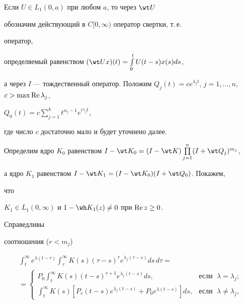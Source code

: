  


\begin{pf} 


Если $U\in L_1(0,a)$ при любом $a$, то через $\wt U$ 


обозначим действующий в $C[0,\infty)$ оператор свертки, т.\,е. 


оператор, 


определяемый равенством $(\wt U x)(t)=\int\limits^t_0 U(t-s)x(s)ds$, 


а через $I$ --- тождественный оператор. Положим $Q_j(t)=c e^{\lambda_j 


t}$, $j=1,\dotsc,n$, $c>\max\re\lambda_j$, 


$Q_0(t)=c\sum\limits^k_{j=1}t^{\alpha_j-1}e^{i\gamma_j t}$, 


где число $c$ достаточно мало и будет уточнено далее. 


 


Определим ядро $K_0$ равенством $I-\wt K_0=(I-\wt 


K)\prod\limits^n_{j=1}(I+\wt Q_j)^{m_j}$, 


а ядро $K_1$ равенством $I-\wt K_1=(I-\wt K_0)(I+\wt Q_0)$. Покажем, 


что 


$K_1\in L_1(0,\infty)$ и $1-\wh K_1(z)\ne0$ при $\operatorname{Re} z\ge0$. 


Справедливы 


соотношения ($r<m_j$) 


\begin{multline*} 


\int^\infty_t e^{\lambda(t-\tau)}\int^\infty_\tau K(s)(\tau-s)^r 


e^{\lambda_j(\tau-s)}ds\,d\tau= \\ 


= 


\begin{cases} 


P_0\displaystyle\int^\infty_t K(s)(t-s)^{r+1} 


e^{\lambda_j(t-s)}ds, &\text{если }\;\lambda=\lambda_j;\\[3mm] 


\displaystyle\int^\infty_t K(s)[P_r(t-s)e^{\lambda_j(t-s)}+ 


P_0e^{\lambda(t-s)}]ds, &\text{если }\;\lambda\ne\lambda_j, 


\end{cases} 


\end{multline*} 



\end{pf}
